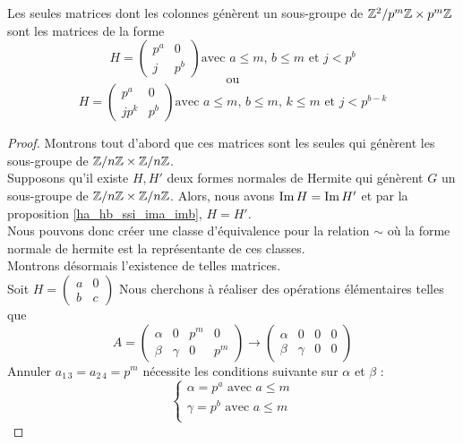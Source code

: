 \documentclass[12pt]{article}
\newcommand*{\pmZpmZ }{p^m\Z \x p^m\Z}
\newcommand*{\ZZpmZ}{\Z^2/\pmZpmZ}
\newcommand{\ZnZ}{\Z/n\Z}
\newcommand{\ZZ}{\ZnZ \x \ZnZ}
\begin{document}
\begin{theorem}
	Les seules matrices dont les colonnes génèrent un sous-groupe de $\ZZpmZ$
	sont les matrices de la forme
	$$H =
		\begin{pmatrix}
			p^a & 0   \\
			j   & p^b
		\end{pmatrix}
		\text{avec $a \le m$, $b \le m$ et $j < p^b$}
	$$
	$$ \text{ ou }$$
	$$ H =\begin{pmatrix}
			p^a  & 0   \\
			jp^k & p^b
		\end{pmatrix}
		\text{avec $a \le m$, $b \le m$, $k \le m$ et $j < p^{b - k}$}
	$$

\end{theorem}
\begin{proof}
	Montrons tout d'abord que ces matrices sont les seules qui génèrent les sous-groupe de $\ZZ$.\\
	Supposons qu'il existe $H,H'$ deux formes normales de Hermite qui génèrent $G$ un sous-groupe
	de $\ZZ$. Alors, nous avons $\im H = \im H'$ et par la proposition \ref{ha_hb_ssi_ima_imb}, $H = H'$.\\
	Nous pouvons donc créer une classe d'équivalence pour la relation $\sim$ où la forme normale
	de hermite est la représentante de ces classes.\\
	\newpage
	\noindent
	Montrons désormais l'existence de telles matrices.\\
	Soit
	$H = \begin{pmatrix}
			a & 0 \\
			b & c
		\end{pmatrix}$
	Nous cherchons à réaliser des opérations élémentaires telles que
	\begin{equation*}
		A = \begin{pmatrix}
			\alpha & 0      & p^m & 0   \\
			\beta  & \gamma & 0   & p^m
		\end{pmatrix}
		\longrightarrow
		\begin{pmatrix}
			\alpha & 0      & 0 & 0 \\
			\beta  & \gamma & 0 & 0
		\end{pmatrix}
	\end{equation*}
	Annuler $a_{1\,3} = a_{2\,4} = p^m$ nécessite les conditions suivante sur $\alpha$ et $\beta$ :
	$$\begin{cases*}
			\alpha = p^a \text{ avec } a \le m\\
			\gamma = p^b \text{ avec } a \le m\\

\end{cases*}$$
\end{proof}
\end{document}
